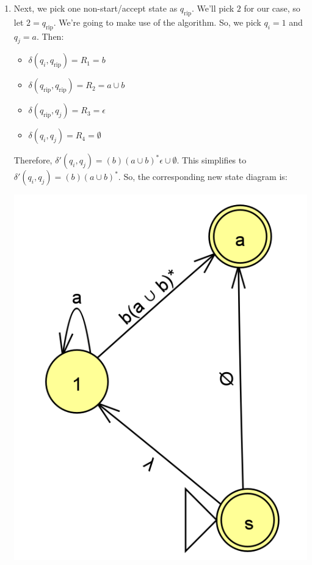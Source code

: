 \documentclass[letterpaper]{article}
\begin{document}
\begin{enumerate}
    \item Next, we pick one non-start/accept state as $q_{\text{rip}}$. We'll pick $2$ for our case, so let $2 = q_{\text{rip}}$. We're going to make use of the  algorithm. So, we pick $q_i = 1$ and $q_j = a$. Then: 
    \begin{itemize}
        \item $\delta(q_i, q_{\text{rip}}) = R_1 = b$
        \item $\delta(q_{\text{rip}}, q_{\text{rip}}) = R_2 = a \cup b$
        \item $\delta(q_{\text{rip}}, q_j) = R_3 = \epsilon$
        \item $\delta(q_i, q_j) = R_4 = \emptyset$
    \end{itemize}
    Therefore, $\delta'(q_i, q_j) = (b)(a \cup b)^* \epsilon \cup \emptyset$. This simplifies to $\delta'(q_i, q_j) = (b)(a \cup b)^*$. So, the corresponding new state diagram is: 
    \begin{center}
        \includegraphics[scale=0.4]{assets/dfa_regex_3.png}
    \end{center}


\end{enumerate}
\end{document}
